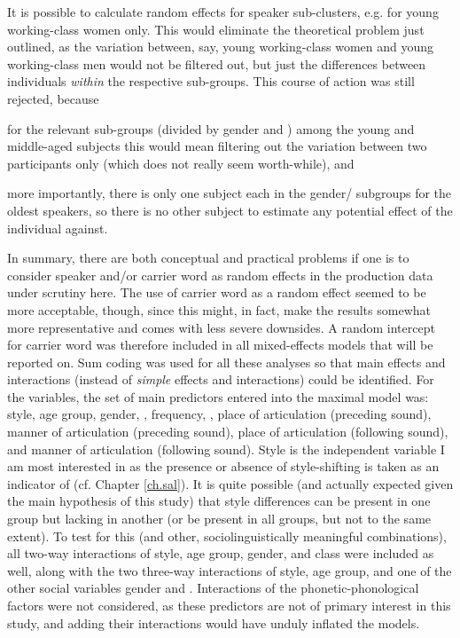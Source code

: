 It is possible to calculate random effects for speaker sub-clusters, e.g. for young working-class women only.
This would eliminate the theoretical problem just outlined, as the variation between, say, young working-class women and young working-class men would not be filtered out, but just the differences between individuals \emph{within} the respective sub-groups.
This course of action was still rejected, because
	\begin{inparaenum}[(a)]
		\item for the relevant sub-groups (divided by gender and ) among the young and middle-aged subjects this would mean filtering out the variation between two participants only (which does not really seem worth-while), and
		\item more importantly, there is only one subject each in the gender/ subgroups for the oldest speakers, so there is no other subject to estimate any potential effect of the individual against.		
	\end{inparaenum}

In summary, there are both conceptual and practical problems if one is to consider speaker and/or carrier word as random effects in the production data under scrutiny here.
The use of carrier word as a random effect seemed to be more acceptable, though, since this might, in fact, make the results somewhat more representative and comes with less severe downsides.
A random intercept for carrier word was therefore included in all mixed-effects models that will be reported on.
Sum coding was used for all these analyses so that main effects and interactions (instead of \emph{simple} effects and interactions) could be identified.
For the  variables, the set of main predictors entered into the maximal model was: style, age group, gender, , frequency, , place of articulation (preceding sound), manner of articulation (preceding sound), place of articulation (following sound), and manner of articulation (following sound).
Style is the independent variable I am most interested in as the presence or absence of style-shifting is taken as an indicator of  (cf. Chapter \ref{ch.sal}).
It is quite possible (and actually expected given the main hypothesis of this study) that style differences can be present in one group but lacking in another (or be present in all groups, but not to the same extent).
To test for this (and other, sociolinguistically meaningful combinations), all two-way interactions of style, age group, gender, and class were included as well, along with the two three-way interactions of style, age group, and one of the other social variables gender and .
Interactions of the phonetic-phonological factors were not considered, as these predictors are not of primary interest in this study, and adding their interactions would have unduly inflated the models.

